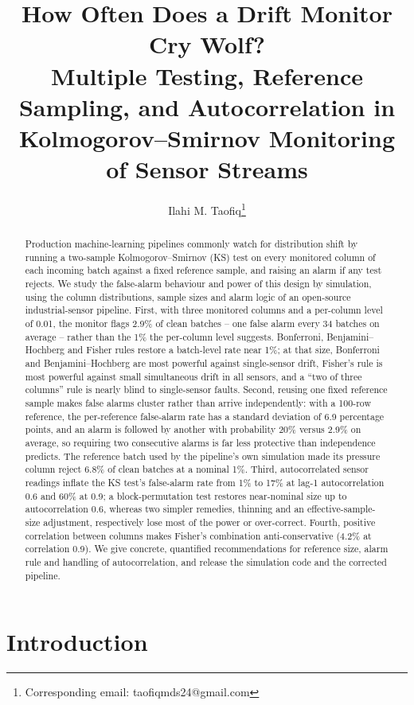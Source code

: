 \documentclass[11pt]{article}
\title{\textbf{How Often Does a Drift Monitor Cry Wolf?} \\[0.4em] \textbf{Multiple Testing, Reference Sampling, and Autocorrelation in \\ Kolmogorov--Smirnov Monitoring of Sensor Streams}}
\author[1]{Ilahi M. Taofiq\thanks{Corresponding email: taofiqmds24@gmail.com}}
\affil[1]{Independent Research}
\date{}
\begin{document}
\maketitle

\begin{abstract}
Production machine-learning pipelines commonly watch for distribution shift by running a two-sample Kolmogorov--Smirnov (KS) test on every monitored column of each incoming batch against a fixed reference sample, and raising an alarm if any test rejects. We study the false-alarm behaviour and power of this design by simulation, using the column distributions, sample sizes and alarm logic of an open-source industrial-sensor pipeline. First, with three monitored columns and a per-column level of 0.01, the monitor flags 2.9\% of clean batches -- one false alarm every 34 batches on average -- rather than the 1\% the per-column level suggests. Bonferroni, Benjamini--Hochberg and Fisher rules restore a batch-level rate near 1\%; at that size, Bonferroni and Benjamini--Hochberg are most powerful against single-sensor drift, Fisher's rule is most powerful against small simultaneous drift in all sensors, and a ``two of three columns'' rule is nearly blind to single-sensor faults. Second, reusing one fixed reference sample makes false alarms cluster rather than arrive independently: with a 100-row reference, the per-reference false-alarm rate has a standard deviation of 6.9 percentage points, and an alarm is followed by another with probability 20\% versus 2.9\% on average, so requiring two consecutive alarms is far less protective than independence predicts. The reference batch used by the pipeline's own simulation made its pressure column reject 6.8\% of clean batches at a nominal 1\%. Third, autocorrelated sensor readings inflate the KS test's false-alarm rate from 1\% to 17\% at lag-1 autocorrelation 0.6 and 60\% at 0.9; a block-permutation test restores near-nominal size up to autocorrelation 0.6, whereas two simpler remedies, thinning and an effective-sample-size adjustment, respectively lose most of the power or over-correct. Fourth, positive correlation between columns makes Fisher's combination anti-conservative (4.2\% at correlation 0.9). We give concrete, quantified recommendations for reference size, alarm rule and handling of autocorrelation, and release the simulation code and the corrected pipeline.
\end{abstract}

\section{Introduction}
\end{document}
